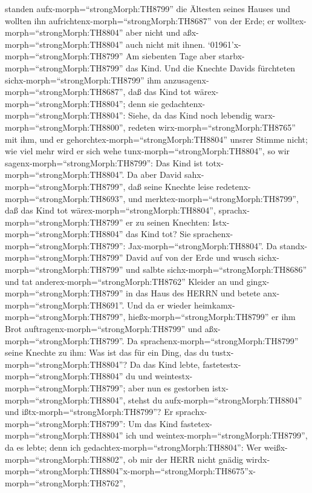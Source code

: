 standen aufx-morph=``strongMorph:TH8799'' die Ältesten seines Hauses und
wollten ihn aufrichtenx-morph=``strongMorph:TH8687'' von der Erde; er
wolltex-morph=``strongMorph:TH8804'' aber nicht und
aßx-morph=``strongMorph:TH8804'' auch nicht mit ihnen. 
`01961'\textbar x-morph=``strongMorph:TH8799'' Am siebenten Tage aber
starbx-morph=``strongMorph:TH8799'' das Kind. Und die Knechte Davids
fürchteten sichx-morph=``strongMorph:TH8799'' ihm
anzusagenx-morph=``strongMorph:TH8687'', daß das Kind tot
wärex-morph=``strongMorph:TH8804''; denn sie
gedachtenx-morph=``strongMorph:TH8804'': Siehe, da das Kind noch
lebendig warx-morph=``strongMorph:TH8800'', redeten
wirx-morph=``strongMorph:TH8765'' mit ihm, und er
gehorchtex-morph=``strongMorph:TH8804'' unsrer Stimme nicht; wie viel
mehr wird er sich wehe tunx-morph=``strongMorph:TH8804'', so wir
sagenx-morph=``strongMorph:TH8799'': Das Kind ist
totx-morph=``strongMorph:TH8804''.  Da aber David
sahx-morph=``strongMorph:TH8799'', daß seine Knechte leise
redetenx-morph=``strongMorph:TH8693'', und
merktex-morph=``strongMorph:TH8799'', daß das Kind tot
wärex-morph=``strongMorph:TH8804'', sprachx-morph=``strongMorph:TH8799''
er zu seinen Knechten: Istx-morph=``strongMorph:TH8804'' das Kind tot?
Sie sprachenx-morph=``strongMorph:TH8799'':
Jax-morph=``strongMorph:TH8804''.  Da
standx-morph=``strongMorph:TH8799'' David auf von der Erde und wusch
sichx-morph=``strongMorph:TH8799'' und salbte
sichx-morph=``strongMorph:TH8686'' und tat
anderex-morph=``strongMorph:TH8762'' Kleider an und
gingx-morph=``strongMorph:TH8799'' in das Haus des HERRN und betete
anx-morph=``strongMorph:TH8691''. Und da er wieder
heimkamx-morph=``strongMorph:TH8799'',
hießx-morph=``strongMorph:TH8799'' er ihm Brot
auftragenx-morph=``strongMorph:TH8799'' und
aßx-morph=``strongMorph:TH8799''.  Da
sprachenx-morph=``strongMorph:TH8799'' seine Knechte zu ihm: Was ist das
für ein Ding, das du tustx-morph=``strongMorph:TH8804''? Da das Kind
lebte, fastetestx-morph=``strongMorph:TH8804'' du und
weintestx-morph=``strongMorph:TH8799''; aber nun es gestorben
istx-morph=``strongMorph:TH8804'', stehst du
aufx-morph=``strongMorph:TH8804'' und ißtx-morph=``strongMorph:TH8799''?
 Er sprachx-morph=``strongMorph:TH8799'': Um das Kind
fastetex-morph=``strongMorph:TH8804'' ich und
weintex-morph=``strongMorph:TH8799'', da es lebte; denn ich
gedachtex-morph=``strongMorph:TH8804'': Wer
weißx-morph=``strongMorph:TH8802'', ob mir der HERR nicht gnädig
wirdx-morph=``strongMorph:TH8804''\textbar x-morph=``strongMorph:TH8675''x-morph=``strongMorph:TH8762'',
